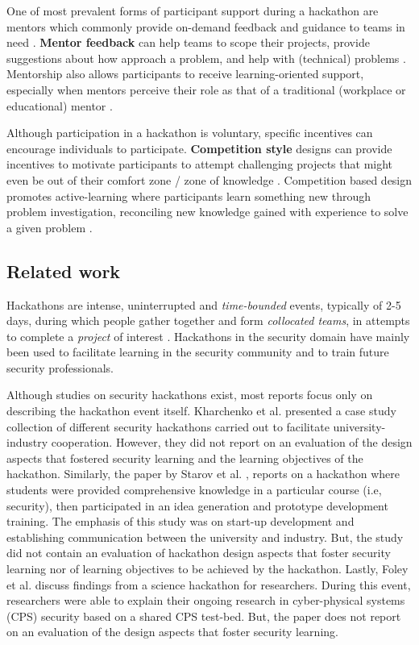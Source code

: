 \documentclass[runningheads]{llncs}
\begin{document}
One of most prevalent forms of participant support during a hackathon are mentors which commonly provide on-demand feedback and guidance to teams in need \cite{soltani2014hackathon,byrne2017iot}. \textbf{Mentor feedback} can help teams to scope their projects, provide suggestions about how approach a problem, and help with (technical) problems \cite{lara2016hackathons}. Mentorship also allows participants to receive learning-oriented support, especially when mentors perceive their role as that of a traditional (workplace or educational) mentor \cite{nolte2020support}.

Although participation in a hackathon is voluntary, specific incentives can encourage individuals to participate. \textbf{Competition style} designs can provide incentives to motivate participants to attempt challenging projects that might even be out of their comfort zone / zone of knowledge \cite{grimes2008robotics}. Competition based design promotes active-learning where participants learn something new through problem investigation, reconciling new knowledge gained with experience to solve a given problem \cite{stoyanov2007effect}.


\subsection{Related work}\label{Sec:relatedworks}
Hackathons are intense, uninterrupted and \textit{time-bounded} events, typically of 2-5 days, during which people gather together and form \textit{collocated teams}, in attempts to complete a \textit{project} of interest \cite{nolte2018you,komssi2015hackathons}. Hackathons in the security domain have mainly been used to facilitate learning in the security community and to train future security professionals.

Although studies on security hackathons exist, most reports focus only on describing the hackathon event itself. 
Kharchenko et al. \cite{kharchenko2016university} presented a case study collection of different security hackathons carried out to facilitate university-industry cooperation. 
However, they did not report on an evaluation of the design aspects that fostered security learning and the learning objectives of the hackathon. Similarly, the paper by Starov et al. \cite{starov2015hacking}, reports on a hackathon where students were provided comprehensive knowledge in a particular course (i.e, security), then participated in an idea generation and prototype development training.
The emphasis of this study was on start-up development and establishing communication between the university and industry. But, the study did not contain an evaluation of hackathon design aspects that foster security learning nor of learning objectives to be achieved by the hackathon. Lastly, Foley et al. \cite{foley2018science} discuss findings from a science hackathon for researchers. During this event, researchers were able to explain their ongoing research in cyber-physical systems (CPS) security based on a shared CPS test-bed.
But, the paper does not report on an evaluation of the design aspects that foster security learning.
\end{document}
